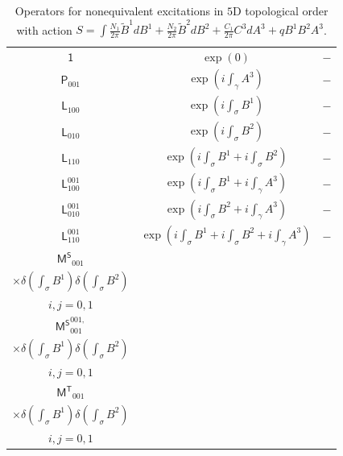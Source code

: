 \documentclass[11pt,nofootinbib,preprint]{revtex4-1}
\begin{document}
\begin{table}
	\caption{\label{tab_excitation}Operators for nonequivalent excitations in $5$D topological order with action $S=\int{\frac{N_1}{2\pi}\tilde{B}^1dB^1+}\frac{N_2}{2\pi}\tilde{B}^2dB^2+\frac{C_1}{2\pi}C^3dA^3+qB^1B^2A^3$. }
	\centering
	\begin{tabular*}{\textwidth}{ccc}
		\toprule
		\makebox[0.15\textwidth][c]{excitation} & \makebox[0.55\textwidth][c]{operator for excitation} & \makebox[0.3\textwidth][c]{equivalent excitations} \\
		\midrule
		$\mathsf{1}$ & $\exp \left( 0 \right)$ & $-$ \\
		\midrule
		$\mathsf{P}_{001}$ & $\exp \left( i\int_{\gamma}{A^3} \right)$ & $-$ \\
		\midrule
		$\mathsf{L}_{100}$ & $\exp \left( i\int_{\sigma}{B^1} \right)$ & $-$ \\
		\midrule
		$\mathsf{L}_{010}$ & $\exp \left( i\int_{\sigma}{B^2} \right)$ & $-$ \\
		\midrule
		$\mathsf{L}_{110}$ & $\exp \left( i\int_{\sigma}{B^1}+i\int_{\sigma}{B^2} \right)$ & $-$ \\
		\midrule
		$\mathsf{L}_{100}^{001}$ & $\exp \left( i\int_{\sigma}{B^1}+i\int_{\gamma}{A^3} \right)$ & $-$ \\
		\midrule
		$\mathsf{L}_{010}^{001}$ & $\exp \left( i\int_{\sigma}{B^2}+i\int_{\gamma}{A^3} \right)$ & $-$ \\
		\midrule
		$\mathsf{L}_{110}^{001}$ & $\exp \left( i\int_{\sigma}{B^1}+i\int_{\sigma}{B^2}+i\int_{\gamma}{A^3} \right)$ & $-$ \\
		\midrule
		$\mathsf{M^S}_{001}$ & \thead{$2\exp \left[ i\int_{\omega}{C^3+\frac{1}{2}\frac{2\pi q}{N_3}\left( d^{-1}B^1B^2+d^{-1}B^2B^1 \right)} \right]$ \\ $\times\delta \left( \int_{\sigma}{B^1} \right) \delta \left( \int_{\sigma}{B^2} \right)$} & \thead{$\mathsf{M^S}_{001}=\mathsf{M^S}_{001}^{,ij0}$ \\  $i,j=0,1$} \\
		\midrule
		$\mathsf{M^S}_{001}^{001,}$ & \thead{$2\exp \left[ i\int_{\gamma}{A^3}+i\int_{\omega}{C^3+\frac{1}{2}\frac{2\pi q}{N_3}\left( d^{-1}B^1B^2+d^{-1}B^2B^1 \right)} \right]$ \\ $\times\delta \left( \int_{\sigma}{B^1} \right) \delta \left( \int_{\sigma}{B^2} \right)$} & \thead{$\mathsf{M^S}_{001}^{001,}=\mathsf{M^S}_{001}^{001,ij0}$ \\ $i,j=0,1$} \\
		\midrule
		$\mathsf{M^T}_{001}$ & \thead{$4\exp \left[ i\int_{\tilde{\omega}}{C^3+\frac{1}{2}\frac{2\pi q}{N_3}\left( d^{-1}B^1B^2+d^{-1}B^2B^1 \right)} \right]$ \\ $\times\delta \left( \int_{\sigma}{B^1} \right) \delta \left( \int_{\sigma}{B^2} \right)$} & \thead{$\mathsf{M^T}_{001}=\mathsf{M^T}_{001}^{,ij0}$ \\ $i,j=0,1$} \\

\end{tabular*}
\end{table}
\end{document}
